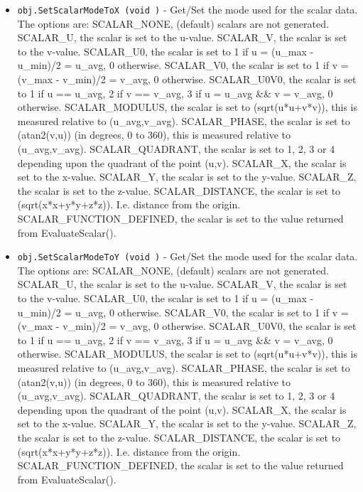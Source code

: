 \begin{itemize}
\item  \verb|obj.SetScalarModeToX (void )| -  Get/Set the mode used for the scalar data.  The options are:
 SCALAR\_NONE, (default) scalars are not generated.
 SCALAR\_U, the scalar is set to the u-value. 
 SCALAR\_V, the scalar is set to the v-value.
 SCALAR\_U0, the scalar is set to 1 if u = (u\_max - u\_min)/2 = u\_avg, 0 otherwise.
 SCALAR\_V0, the scalar is set to 1 if v = (v\_max - v\_min)/2 = v\_avg, 0 otherwise.
 SCALAR\_U0V0, the scalar is 
   set to 1 if u == u\_avg, 2 if v == v\_avg, 3 if u = u\_avg \&\& v = v\_avg, 0 otherwise.
 SCALAR\_MODULUS, the scalar is set to (sqrt(u*u+v*v)), this is measured relative to (u\_avg,v\_avg).
 SCALAR\_PHASE, the scalar is set to (atan2(v,u)) (in degrees, 0 to 360), this is measured relative to (u\_avg,v\_avg).
 SCALAR\_QUADRANT, the scalar is set to 1, 2, 3 or 4 
   depending upon the quadrant of the point (u,v).
 SCALAR\_X, the scalar is set to the x-value. 
 SCALAR\_Y, the scalar is set to the y-value. 
 SCALAR\_Z, the scalar is set to the z-value. 
 SCALAR\_DISTANCE, the scalar is set to (sqrt(x*x+y*y+z*z)). I.e. distance from the origin.
 SCALAR\_FUNCTION\_DEFINED, the scalar is set to the value returned from EvaluateScalar().

\item  \verb|obj.SetScalarModeToY (void )| -  Get/Set the mode used for the scalar data.  The options are:
 SCALAR\_NONE, (default) scalars are not generated.
 SCALAR\_U, the scalar is set to the u-value. 
 SCALAR\_V, the scalar is set to the v-value.
 SCALAR\_U0, the scalar is set to 1 if u = (u\_max - u\_min)/2 = u\_avg, 0 otherwise.
 SCALAR\_V0, the scalar is set to 1 if v = (v\_max - v\_min)/2 = v\_avg, 0 otherwise.
 SCALAR\_U0V0, the scalar is 
   set to 1 if u == u\_avg, 2 if v == v\_avg, 3 if u = u\_avg \&\& v = v\_avg, 0 otherwise.
 SCALAR\_MODULUS, the scalar is set to (sqrt(u*u+v*v)), this is measured relative to (u\_avg,v\_avg).
 SCALAR\_PHASE, the scalar is set to (atan2(v,u)) (in degrees, 0 to 360), this is measured relative to (u\_avg,v\_avg).
 SCALAR\_QUADRANT, the scalar is set to 1, 2, 3 or 4 
   depending upon the quadrant of the point (u,v).
 SCALAR\_X, the scalar is set to the x-value. 
 SCALAR\_Y, the scalar is set to the y-value. 
 SCALAR\_Z, the scalar is set to the z-value. 
 SCALAR\_DISTANCE, the scalar is set to (sqrt(x*x+y*y+z*z)). I.e. distance from the origin.
 SCALAR\_FUNCTION\_DEFINED, the scalar is set to the value returned from EvaluateScalar().


\end{itemize}
